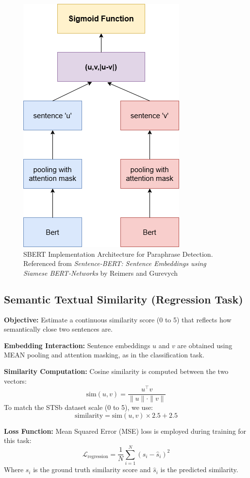 \begin{figure}[H]
    \centering
    \includegraphics[width=0.6\linewidth]{Figures/SBERT_PD.png}
    \caption{SBERT Implementation Architecture for Paraphrase Detection. Referenced from \textit{Sentence-BERT: Sentence Embeddings using Siamese BERT-Networks} by Reimers and Gurevych~\cite{reimers2019sentence}}
    \label{fig:sbert_pd_architecture}
\end{figure}

\subsection{Semantic Textual Similarity (Regression Task)}

\textbf{Objective:} Estimate a continuous similarity score (0 to 5) that reflects how semantically close two sentences are.

\textbf{Embedding Interaction:} Sentence embeddings $u$ and $v$ are obtained using MEAN pooling and attention masking, as in the classification task.

\textbf{Similarity Computation:} Cosine similarity is computed between the two vectors:
\[
\text{sim}(u, v) = \frac{u^\top v}{\|u\| \cdot \|v\|}
\]
To match the STSb dataset scale (0 to 5), we use:
\[
\text{similarity} = \text{sim}(u, v) \times 2.5 + 2.5
\]

\textbf{Loss Function:} Mean Squared Error (MSE) loss is employed during training for this task:
\[
\mathcal{L}_{\text{regression}} = \frac{1}{N} \sum_{i=1}^{N} (s_i - \hat{s}_i)^2
\]
Where $s_i$ is the ground truth similarity score and $\hat{s}_i$ is the predicted similarity.

